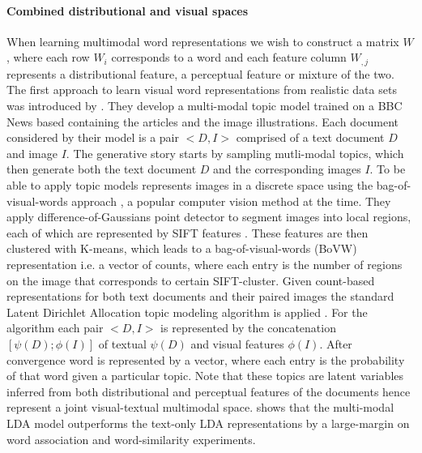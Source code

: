 \paragraph{Combined distributional and visual spaces}
When learning multimodal word representations we wish to construct a matrix $W$, where each row $W_i$
corresponds to a word and each feature column $W_{,j}$ represents a distributional feature,
a perceptual feature or mixture of the two.
The first approach to learn visual word representations from realistic data sets
was introduced by \cite{feng2010visual}. They develop a multi-modal topic model trained on a
BBC News based containing the articles and the image illustrations. Each document considered by their model
is a pair $<D, I>$ comprised of a text document $D$ and image $I$.
The generative story starts by sampling mutli-modal topics,
which then generate both the text document $D$ and the corresponding images $I$.
To be able to apply topic models \cite{feng2010visual} represents images
in a discrete space using the bag-of-visual-words approach \cite{csurka2004visual},
a popular computer vision method at the time.
They apply difference-of-Gaussians point detector to segment images
into local regions, each of which are represented by SIFT features \cite{lowe1999object}.
These features are then clustered with K-means, which leads to a
bag-of-visual-words (BoVW) representation i.e.
a vector of counts, where each entry is the number of regions on the image that
corresponds to certain SIFT-cluster. Given count-based representations for both
text documents and their paired images the standard
Latent Dirichlet Allocation topic modeling algorithm is applied \cite{blei2003latent}.
For the algorithm each pair $<D, I>$ is represented by the concatenation
$[\psi(D);\phi(I)]$ of textual $\psi(D)$ and visual features $\phi(I)$.
After convergence word is represented by a vector,
where each entry is the probability of that word given a particular topic.
Note that these topics are latent variables inferred from
both distributional and perceptual features of the documents hence represent a joint
visual-textual multimodal space. \cite{feng2010visual}
shows that the multi-modal LDA model outperforms the text-only LDA representations by a
large-margin on word association and word-similarity experiments.

